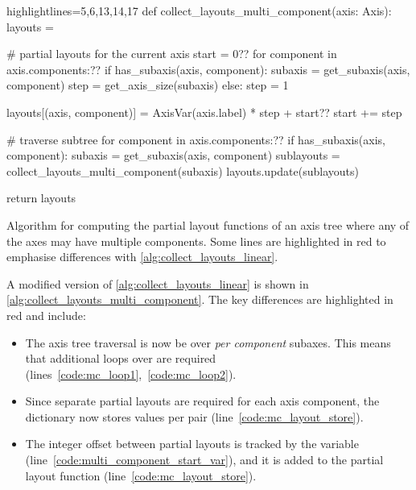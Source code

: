 \documentclass[thesis]{subfiles}
\begin{document}
\begin{algorithm}
  \begin{flushright}
    \begin{minipage}{.96\textwidth}
      \begin{pyalg2*}{highlightlines={5,6,13,14,17}}
        def collect_layouts_multi_component(axis: Axis):
          layouts = {}

          # partial layouts for the current axis
          start = 0?\label{code:multi_component_start_var}?
          for component in axis.components:?\label{code:mc_loop1}?
            if has_subaxis(axis, component):
              subaxis = get_subaxis(axis, component)
              step = get_axis_size(subaxis)
            else:
              step = 1

            layouts[(axis, component)] = AxisVar(axis.label) * step + start?\label{code:mc_layout_store}?
            start += step

          # traverse subtree
          for component in axis.components:?\label{code:mc_loop2}?
            if has_subaxis(axis, component): 
              subaxis = get_subaxis(axis, component)
              sublayouts = collect_layouts_multi_component(subaxis)
              layouts.update(sublayouts)

          return layouts
      \end{pyalg2*}
    \end{minipage}
  \end{flushright}

  \caption{
    Algorithm for computing the partial layout functions of an axis tree where any of the axes may have multiple components.
    Some lines are highlighted in red to emphasise differences with \cref{alg:collect_layouts_linear}.
  }
  \label{alg:collect_layouts_multi_component}
\end{algorithm}

A modified version of \cref{alg:collect_layouts_linear} is shown in \cref{alg:collect_layouts_multi_component}.
The key differences are highlighted in red and include:
\begin{itemize}
  \item
    The axis tree traversal is now be over \emph{per component} subaxes.
    This means that additional loops over  are required (lines~\ref{code:mc_loop1},~\ref{code:mc_loop2}).
  \item
    Since separate partial layouts are required for each axis component, the  dictionary now stores values per  pair (line~\ref{code:mc_layout_store}).
  \item
    The integer offset between partial layouts is tracked by the  variable (line~\ref{code:multi_component_start_var}), and it is added to the partial layout function (line~\ref{code:mc_layout_store}).
\end{itemize}
\end{document}
